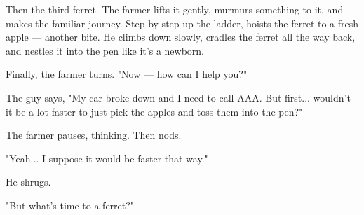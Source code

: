 Then the third ferret. The farmer lifts it gently, murmurs something to it, and makes the familiar journey. Step by step up the ladder, hoists the ferret to a fresh apple — another bite. He climbs down slowly, cradles the ferret all the way back, and nestles it into the pen like it's a newborn.

Finally, the farmer turns. "Now — how can I help you?"

The guy says, "My car broke down and I need to call AAA. But first... wouldn't it be a lot faster to just pick the apples and toss them into the pen?"

The farmer pauses, thinking. Then nods.

"Yeah... I suppose it would be faster that way."

He shrugs.

"But what's time to a ferret?"